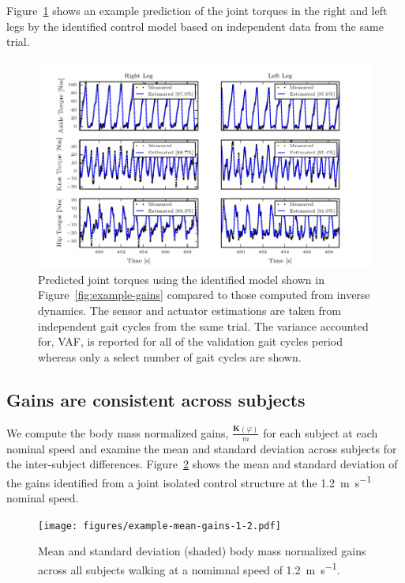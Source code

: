 \documentclass{article}
\begin{document}
Figure~\ref{fig:example-fit} shows an example prediction of the joint torques
in the right and left legs by the identified control model based on independent
data from the same trial. 
%
\begin{figure}
  \begin{center}
    \includegraphics{figures/example-identified-joint-isolated-fit.pdf}
    \caption{Predicted joint torques using the identified model shown in
      Figure~\ref{fig:example-gains} compared to those computed from inverse
      dynamics. The sensor and actuator estimations are taken from independent
      gait cycles from the same trial. The variance accounted for, VAF, is
      reported for all of the validation gait cycles period whereas only a select
      number of gait cycles are shown. }
    \label{fig:example-fit}
  \end{center}
\end{figure}

\subsection*{Gains are consistent across subjects}
%
We compute the body mass normalized gains, $\frac{\mathbf{K}(\varphi)}{m}$ for
each subject at each nominal speed and examine the mean and standard deviation
across subjects for the inter-subject differences.
Figure~\ref{fig:mean-gains-1-2} shows the mean and standard deviation of the
gains identified from a joint isolated control structure at the
1.2~\si{\meter\per\second} nominal speed.
%
\begin{figure}
  \begin{center}
    \texttt{[image: figures/example-mean-gains-1-2.pdf]}
    \caption{Mean and standard deviation (shaded) body mass normalized gains
      across all subjects walking at a nomimnal speed of
      1.2~\si{\meter\per\second}.}
    \label{fig:mean-gains-1-2}
  \end{center}
\end{figure}
\end{document}
